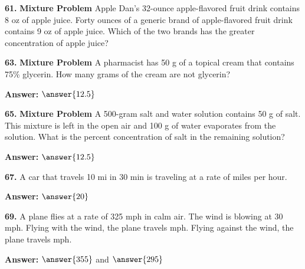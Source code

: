\documentclass{ximera}
\begin{document}
\begin{problem}
\textbf{61.} \textbf{Mixture Problem} Apple Dan's 32-ounce apple-flavored fruit drink contains
  8 oz of apple juice. Forty ounces of a generic brand of apple-flavored fruit drink
  contains 9 oz of apple juice. Which of the two brands has the greater concentration of
  apple juice?

\begin{multipleChoice}
\end{multipleChoice}
\end{problem}

\begin{problem}
\textbf{63.} \textbf{Mixture Problem} A pharmacist has 50 g of a topical cream that contains
  75\% glycerin. How many grams of the cream are not glycerin?

\textbf{Answer:} $\answer{12.5}$
\end{problem}

\begin{problem}
\textbf{65.} \textbf{Mixture Problem} A 500-gram salt and water solution contains 50 g of
  salt. This mixture is left in the open air and 100 g of water evaporates from the
  solution. What is the percent concentration of salt in the remaining solution?

\textbf{Answer:} $\answer{12.5}$
\end{problem}

\begin{problem}
\textbf{67.} A car that travels 10 mi in 30 min is traveling at a rate of \blank{} miles per
  hour.

\textbf{Answer:} $\answer{20}$
\end{problem}

\begin{problem}
\textbf{69.} A plane flies at a rate of 325 mph in calm air. The wind is blowing at 30 mph.
  Flying with the wind, the plane travels \blank{} mph. Flying against the wind, the
  plane travels \blank{} mph.

\textbf{Answer:} $\answer{355}$ and $\answer{295}$
\end{problem}
\end{document}

